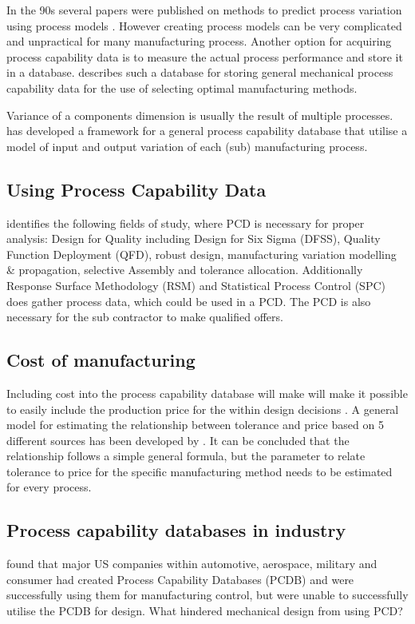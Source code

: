 \documentclass[aip,amsmath, preprint, author-year]{revtex4-1}
\begin{document}
In the 90s several papers were published on methods to predict process variation using process models \citep{thornton2000use}. 
However creating process models can be very complicated and unpractical for many manufacturing process. 
Another option for acquiring process capability data is to measure the actual process performance and store it in a database. \cite{perzyk1998selection} describes such a database for storing general mechanical process capability data for the use of selecting optimal manufacturing methods.

Variance of a components dimension is usually the result of multiple processes. 
 \cite{kern2003forecasting} has developed a framework for a general process capability database that utilise a model of input and output variation of each (sub) manufacturing process. 

\subsection{Using Process Capability Data}
\cite{kern2003forecasting} identifies the following fields of study, where PCD is necessary for proper analysis: Design for Quality including Design for Six Sigma (DFSS), Quality Function Deployment (QFD), robust design, manufacturing variation modelling \& propagation, selective Assembly and tolerance allocation. 
Additionally Response Surface Methodology (RSM) and Statistical Process Control (SPC) does gather process data, which could be used in a PCD. 
The PCD is also necessary for the sub contractor to make qualified offers.


\subsection{Cost of manufacturing}
Including cost into the process capability database will make will make it possible to easily include the production price for the within design decisions \citep{perzyk1998selection, thornton2000use}. 
A general model for estimating the relationship between tolerance and price based on 5 different sources has been developed by \cite{sfantsikopoulos1990cost}.
It can be concluded that the relationship follows a simple general formula, but the parameter to relate tolerance to price for the specific manufacturing method needs to be estimated for every process. 

\subsection{Process capability databases in industry}
\cite{tata1999effective, tata1999process} found that major US companies within automotive, aerospace, military and consumer had created Process Capability Databases (PCDB) and were successfully using them for manufacturing control, but were unable to successfully utilise the PCDB for design. 
What hindered mechanical design from using PCD? 
\end{document}

